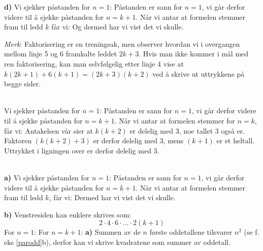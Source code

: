 \textbf{d)} Vi sjekker påstanden for $ n=1 $:
Påstanden er sann for $ n=1 $, vi går derfor videre til å sjekke påstanden for $ n=k+1 $. Når vi antar at formelen stemmer fram til ledd $ k $ får vi:
Og dermed har vi vist det vi skulle. 

\textsl{Merk}: Faktorisering er en treningsak, men observer hvordan vi i overgangen mellom linje 5 og 6 framkalte leddet $ 2k+3 $. Hvis man ikke kommer i mål med ren faktorisering, kan man selvfølgelig etter linje 4 vise at $ k(2k+1)+6(k+1)=(2k+3)(k+2) $ ved å skrive ut uttrykkene på begge sider.

 \\
Vi sjekker påstanden for $ {n=1}$:
Påstanden er sann for $ {n=1} $, vi går derfor videre til å sjekke påstanden for $ {n=k+1} $. Når vi antar at formelen stemmer for $ n=k $, får vi:
Antakelsen vår sier at $ k(k+2) $ er delelig med 3, noe tallet 3 også er. Faktoren $ (k(k+2)+3) $ er derfor delelig med 3, mens $ (k+1) $ er et heltall. Uttrykket i ligningen over er derfor delelig med 3.
 
 \\
\textbf{a)} Vi sjekker påstanden for $ {n=1}$:
Påstanden er sann for $ {n=1} $, vi går derfor videre til å sjekke påstanden for $ {n=k+1} $. Når vi antar at formelen stemmer fram til ledd $ k $, får vi:
Dermed har vi vist det vi skulle.

\textbf{b)} Venstresiden kan enklere skrives som:
\[ 2\cdot4\cdot6\cdot\ldots\cdot2(k+1) \]
For $ {n=1} $:
For $ {n=k+1} $:
\newpage
{}
\textbf{a)} Summen av de $ n $ første oddetallene tilsvarer $ n^2 $ (se f. eks \ref{parodd}b), derfor kan vi skrive kvadratene som summer av oddetall.

